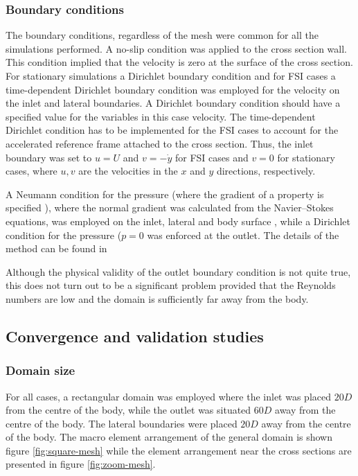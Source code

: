 \subsubsection{Boundary conditions}

The boundary conditions, regardless of the mesh  were common for all the simulations performed. A no-slip condition was applied to the cross section wall. This condition implied that the velocity is zero at the surface of the cross section. For stationary simulations a Dirichlet boundary condition and for FSI cases a time-dependent Dirichlet boundary condition was employed for the velocity on the inlet and lateral boundaries. A Dirichlet boundary condition should have a specified value for the variables \citep{kreyszig2010} in this case velocity. The time-dependent Dirichlet condition has to be implemented for the FSI cases to account for the accelerated reference frame attached to the cross section. Thus, the inlet boundary was set to $u=U$ and $v=-\dot{y}$ for FSI cases and $v=0$ for stationary cases, where $u,v$ are the velocities in the $x$ and $y$ directions, respectively.

A Neumann condition for the pressure (where the gradient of a property is specified \citet{tu2007}), where the normal gradient was calculated from the Navier--Stokes equations, was employed on the inlet, lateral and body surface \citep{gresho1987}, while a Dirichlet condition for the pressure ($p=0$ was enforced at the outlet. The details of the method can be found in \citet{Thompson2006,Thompson1996a}

 Although the physical validity of the outlet boundary condition is not quite true, this does not turn out to be a significant problem provided that the Reynolds numbers are low and the domain is sufficiently far away from the body.


 
\subsection{Convergence and validation studies}

\subsubsection{Domain size}

 For all cases, a rectangular domain was employed where the inlet was placed $20D$ from the centre of the body, while the outlet was situated $60D$ away from the centre of the body. The lateral boundaries were placed $20D$ away from the centre of the body. The macro element arrangement of the general domain is shown figure \ref{fig:square-mesh} while the element arrangement near the cross sections are presented in figure \ref{fig:zoom-mesh}. 
 
